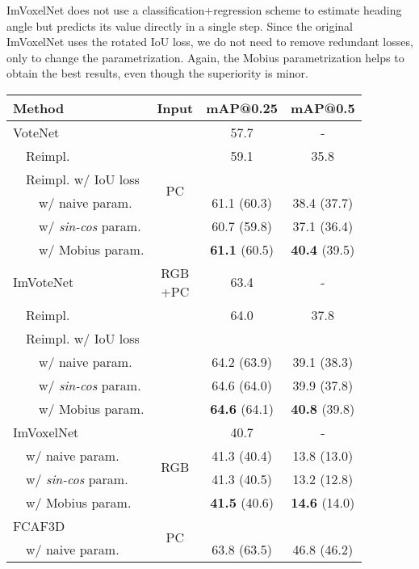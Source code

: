 \documentclass[runningheads]{llncs}
\begin{document}
ImVoxelNet does not use a classification+regression scheme to estimate heading angle but predicts its value directly in a single step. Since the original ImVoxelNet uses the rotated IoU loss, we do not need to remove redundant losses, only to change the parametrization. Again, the Mobius parametrization helps to obtain the best results, even though the superiority is minor.

\begin{table}[h!]
    \centering \setlength{\tabcolsep}{2.5pt}
    \begin{tabular}{l|c|cc}
    \hline
    Method & Input & mAP@0.25 & mAP@0.5 \\ \hline
    VoteNet\cite{qi2019votenet} & \multirow{6}{*}{PC} & 57.7 & - \\
    \ \ Reimpl.\cite{2020mmdetection3d} & & 59.1 & 35.8 \\
    \ \ Reimpl. w/ IoU loss & & & \\
    \ \ \ \ w/ naive param. & & 61.1 (60.3) & 38.4 (37.7) \\
    \ \ \ \ w/ \textit{sin-cos} param. & & 60.7 (59.8) & 37.1 (36.4) \\
    \ \ \ \ w/ Mobius param. & & \textbf{61.1} (60.5) & \textbf{40.4} (39.5) \\ \hline
    ImVoteNet\cite{qi2020imvotenet} & \multirowcell{6}{RGB \\ +PC} & 63.4 & - \\
    \ \ Reimpl.\cite{2020mmdetection3d} & & 64.0 & 37.8 \\
    \ \ Reimpl. w/ IoU loss & & & \\
    \ \ \ \ w/ naive param. & & 64.2 (63.9) & 39.1 (38.3) \\
    \ \ \ \ w/ \textit{sin-cos} param. & & 64.6 (64.0) & 39.9 (37.8) \\
    \ \ \ \ w/ Mobius param. & & \textbf{64.6} (64.1) & \textbf{40.8} (39.8) \\ \hline
    ImVoxelNet\cite{rukhovich2021imvoxelnet} & \multirow{4}{*}{RGB} & 40.7 & - \\
    \ \ w/ naive param. & & 41.3 (40.4) & 13.8 (13.0) \\
    \ \ w/ \textit{sin-cos} param. & & 41.3 (40.5) & 13.2 (12.8) \\
    \ \ w/ Mobius param. & & \textbf{41.5} (40.6) & \textbf{14.6} (14.0) \\ \hline
    FCAF3D & \multirow{4}{*}{PC} & & \\
    \ \ w/ naive param. & & 63.8 (63.5) & 46.8 (46.2) \\

\end{tabular}
\end{table}
\end{document}
